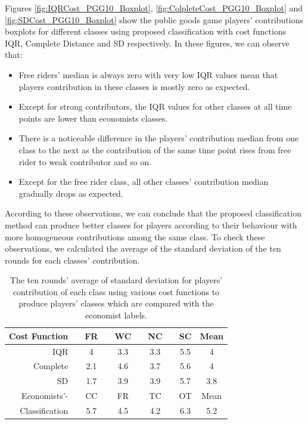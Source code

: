 Figures \ref{fig:IQRCost_PGG10_Boxplot}, \ref{fig:ColpleteCost_PGG10_Boxplot} and \ref{fig:SDCost_PGG10_Boxplot} show the public goods game players' contributions boxplots for different classes using proposed classification with cost functions IQR, Complete Distance and SD respectively. In these figures, we can observe that:

\begin{itemize}
    \item Free riders' median is always zero with very low IQR values mean that players contribution in these classes is mostly zero as expected.
    
    \item Except for strong contributors, the IQR values for other classes at all time points are lower than economists classes.
    
    \item There is a noticeable difference in the players' contribution median from one class to the next as the contribution of the same time point rises from free rider to weak contributor and so on.
    
    \item Except for the free rider class, all other classes' contribution median gradually drops as expected.
\end{itemize}

According to these observations, we can conclude that the proposed classification method can produce better classes for players according to their behaviour with more homogeneous contributions among the same class. To check these observations, we calculated the average of the standard deviation of the ten rounds for each classes' contribution.


\begin{table}[!h]
    \small
    \centering
    \caption{The ten rounds' average of standard deviation for players' contribution of each class using various cost functions to produce players' classes which are compared with the economist labels.}
    \label{tab:stdevContribDistribution_PGG10}
    \begin{tabular}{@{}rccccccccc@{}}
        \toprule
        Cost Function & \phantom{aa} & FR & \phantom{a} & WC & \phantom{a} & NC & \phantom{a} & SC  & Mean \\
        \midrule
        IQR           & \phantom{aa} & 4  & \phantom{a} & 3.3& \phantom{a} & 3.3& \phantom{a} & 5.5 &  4    \\
        Complete      & \phantom{aa} & 2.1& \phantom{a} & 4.6& \phantom{a} & 3.7& \phantom{a} & 5.6 &  4    \\
        SD            & \phantom{aa} & 1.7& \phantom{a} & 3.9& \phantom{a} & 3.9& \phantom{a} & 5.7 &  3.8  \\
        \midrule
        Economists'-  & \phantom{aa} & CC & \phantom{a} & FR & \phantom{a} & TC & \phantom{a} & OT  &  Mean \\
        Classification& \phantom{aa} & 5.7& \phantom{a} & 4.5& \phantom{a} & 4.2& \phantom{a} & 6.3 &  5.2   \\
        \bottomrule
    \end{tabular}
\end{table}

